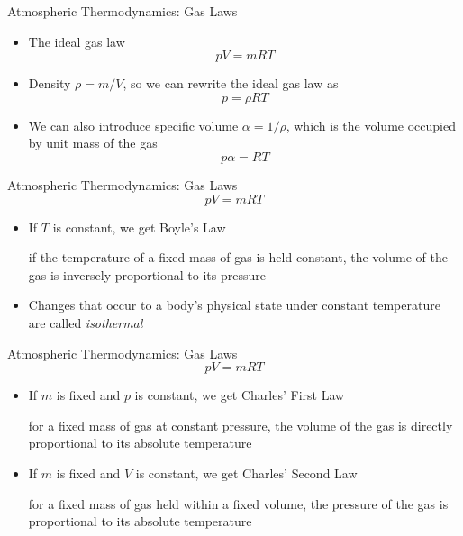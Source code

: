 \begin{frame}{Atmospheric Thermodynamics: Gas Laws}
\begin{itemize}
	\item The ideal gas law
	$$pV=mRT$$
	\item Density $\rho = m/V$, so we can rewrite the ideal gas law as 
	$$p = \rho RT$$
	\item We can also introduce specific volume $\alpha = 1/\rho$, which is the volume occupied by unit mass of the gas
	$$p\alpha = RT$$
\end{itemize}
\end{frame}

\begin{frame}{Atmospheric Thermodynamics: Gas Laws}
$$pV=mRT$$
\begin{itemize}
	\item If $T$ is constant, we get Boyle's Law
	\begin{fancydefs}
		if the temperature of a fixed mass of gas is held constant, the volume of the gas is inversely proportional to its pressure
	\end{fancydefs}
	\item Changes that occur to a body's physical state under constant temperature are called \textit{isothermal}
\end{itemize}
\end{frame}

\begin{frame}{Atmospheric Thermodynamics: Gas Laws}
$$pV=mRT$$
\begin{itemize}
	\item If $m$ is fixed and $p$ is constant, we get Charles' First Law
	\begin{fancydefs}
		for a fixed mass of gas at constant pressure, the volume of the gas is directly proportional to its absolute temperature
	\end{fancydefs}
	\item If $m$ is fixed and $V$ is constant, we get Charles' Second Law
	\begin{fancydefs}
		for a fixed mass of gas held within a fixed volume, the pressure of the gas is proportional to its absolute temperature
	\end{fancydefs}
	
\end{itemize}
\end{frame}

